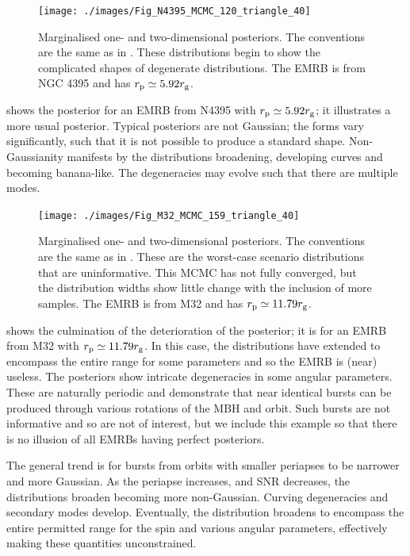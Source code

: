 \begin{figure}%
\centering
\vspace{0.5\baselineskip}
   \texttt{[image: ./images/Fig\_N4395\_MCMC\_120\_triangle\_40]}
\caption{Marginalised one- and two-dimensional posteriors. The conventions are the same as in . These distributions begin to show the complicated shapes of degenerate distributions. The EMRB is from NGC 4395 and has $r_\mathrm{p} \simeq 5.92 r_\mathrm{g}$.}
\label{fig:MCMC-b}
\end{figure}
 shows the posterior for an EMRB from N4395 with $r_\mathrm{p} \simeq 5.92 r_\mathrm{g}$; it illustrates a more usual posterior. Typical posteriors are not Gaussian; the forms vary significantly, such that it is not possible to produce a standard shape. Non-Gaussianity manifests by the distributions broadening, developing curves and becoming banana-like. The degeneracies may evolve such that there are multiple modes.

\begin{figure}%
\centering
	\vspace{0.5\baselineskip}
   \texttt{[image: ./images/Fig\_M32\_MCMC\_159\_triangle\_40]}
\caption{Marginalised one- and two-dimensional posteriors. The conventions are the same as in . These are the worst-case scenario distributions that are uninformative. This MCMC has not fully converged, but the distribution widths show little change with the inclusion of more samples. The EMRB is from M32 and has $r_\mathrm{p} \simeq 11.79 r_\mathrm{g}$.}
\label{fig:MCMC-c}
\end{figure}
 shows the culmination of the deterioration of the posterior; it is for an EMRB from M32 with $r_\mathrm{p} \simeq 11.79 r_\mathrm{g}$. In this case, the distributions have extended to encompass the entire range for some parameters and so the EMRB is (near) useless. The posteriors show intricate degeneracies in some angular parameters. These are naturally periodic and demonstrate that near identical bursts can be produced through various rotations of the MBH and orbit. Such bursts are not informative and so are not of interest, but we include this example so that there is no illusion of all EMRBs having perfect posteriors.

The general trend is for bursts from orbits with smaller periapses to be narrower and more Gaussian. As the periapse increases, and SNR decreases, the distributions broaden becoming more non-Gaussian. Curving degeneracies and secondary modes develop. Eventually, the distribution broadens to encompass the entire permitted range for the spin and various angular parameters, effectively making these quantities unconstrained.

